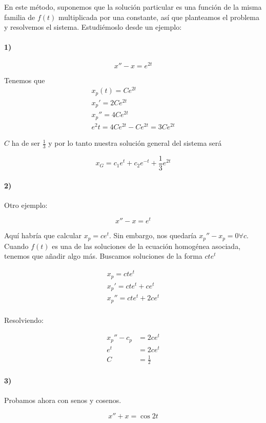 \documentclass[nochap]{apuntes}
\begin{document}
En este método, suponemos que la solución particular es una función de la misma familia de $f(t)$ multiplicada por una constante, así que planteamos el problema y resolvemos el sistema. Estudiémoslo desde un ejemplo:

\paragraph{1)} \[ x'' - x = e^{2t} \]

Tenemos que 
\begin{gather*}
x_p(t) = Ce^{2t} \\
x_p' = 2Ce^{2t} \\
x_p'' = 4Ce^{2t} \\
e^2t = 4Ce^{2t} - Ce^{2t} = 3Ce^{2t} 
\end{gather*}

$C$ ha de ser $\frac{1}{3}$ y por lo tanto nuestra solución general del sistema será

\[ x_G = c_1e^t + c_2e^{-t} + \frac{1}{3}e^{2t} \]

\paragraph{2)} Otro ejemplo:

\[ x''-x= e^t \]

Aquí habría que calcular $x_p = ce^t$. Sin embargo, nos quedaría $x_p'' - x_p = 0 ∀c$. Cuando $f(t)$ es una de las soluciones de la ecuación homogénea asociada, tenemos que añadir algo más. Buscamos soluciones de la forma $cte^t$

\begin{gather*}
x_p  = cte^t \\
x_p' = cte^t + ce^t \\
x_p'' = cte^t + 2ce^t \\
\end{gather*}

Resolviendo:

\begin{align*}
x_p'' - c_p &= 2ce^t \\
e^t &= 2ce^t \\
C &= \frac{1}{2} 
\end{align*}

\paragraph{3)} Probamos ahora con senos y cosenos.

\[ x'' + x= \cos 2t\]
\end{document}
